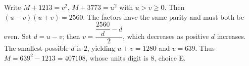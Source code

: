 Write $M+1213=v^2$, $M+3773=u^2$ with $u>v\ge0$. Then $(u-v)(u+v)=2560$. The factors have the same parity and must both be even. Set $d=u-v$; then $v=\dfrac{\dfrac{2560}{d}-d}{2}$, which decreases as positive $d$ increases. The smallest possible $d$ is $2$, yielding $u+v=1280$ and $v=639$. Thus $M=639^2-1213=407108$, whose units digit is $\boxed{8}$, choice E.
